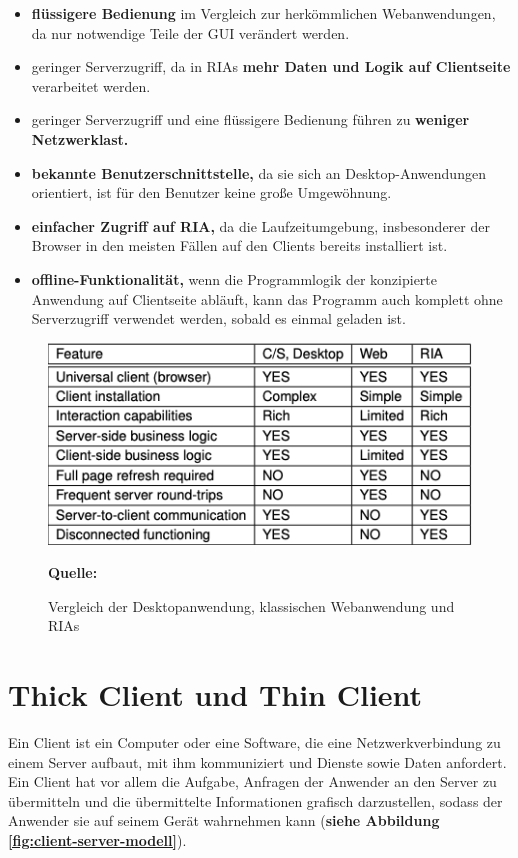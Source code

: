 \begin{itemize}
\item \textbf{flüssigere Bedienung} im Vergleich zur herkömmlichen Webanwendungen, da nur notwendige Teile der GUI verändert werden.
\item geringer Serverzugriff, da in RIAs \textbf{mehr Daten und Logik auf Clientseite} verarbeitet werden.
\item geringer Serverzugriff und eine flüssigere Bedienung führen zu \textbf{weniger Netzwerklast.}
\item \textbf{bekannte Benutzerschnittstelle,} da sie sich an Desktop-Anwendungen orientiert, ist für den Benutzer keine große Umgewöhnung.
\item \textbf{einfacher Zugriff auf RIA,} da die Laufzeitumgebung, insbesonderer der Browser in den meisten Fällen auf den Clients bereits installiert ist.
\item \textbf{offline-Funktionalität,} wenn die Programmlogik der konzipierte Anwendung auf Clientseite abläuft, kann das Programm auch komplett ohne Serverzugriff verwendet werden, sobald es einmal geladen ist. 
\end{itemize}

\begin{figure}[H]
  \begin{center}
    \includegraphics[scale=0.6]{img/desktop_web_ria_vergleich}
	\caption{Vergleich der Desktopanwendung, klassischen Webanwendung und RIAs}
	\footnotesize\sffamily\textbf{Quelle:} \cite{Boz2006}  
	\label{fig:ria}
  \end{center}   
\end{figure}

\section{Thick Client und Thin Client}
\label{sec:thick client und thin client}
Ein Client ist ein Computer oder eine Software, die eine Netzwerkverbindung zu einem Server aufbaut, mit ihm kommuniziert und Dienste sowie Daten anfordert. Ein Client hat vor allem die Aufgabe, Anfragen der Anwender an den Server zu übermitteln und die übermittelte Informationen grafisch darzustellen, sodass der Anwender sie auf seinem Gerät wahrnehmen kann (\textbf{siehe Abbildung \ref{fig:client-server-modell}}).\bigskip

